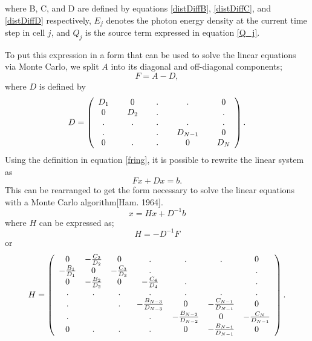	where B, C, and D are defined by equations \ref{distDiffB}, \ref{distDiffC}, and \ref{distDiffD} respectively, $E_j$ denotes the photon energy density at the current time step in cell $j$, and $Q_j$ is the source term expressed in equation \ref{Q_j}.
	
	To put this expression in a form that can be used to solve the linear equations via Monte Carlo, we split $A$ into its diagonal and off-diagonal components;
	\begin{equation}
	\label{fring}
	F=A-D,
	\end{equation}
	where $D$ is defined by
	\[
	D=
	\left(
	\begin{array}{ c c c c c c c c c }
	D_1 & \, & 0 & \, & . & \, & . & \, & 0 \\
	0 & \, & D_2 & \, & . & \, & \, & \, & . \\
	. & \, & . & \, & . & \, & . & \, & . \\
	. & \, & \, & \, & .  & \, & D_{N-1} & \, & 0  \\
	0 & \, & . & \, & . & \, & 0 & \, & D_{N} \\
	\end{array}
	\right).
	\]
	Using the definition in equation \ref{fring}, it is possible to rewrite the linear system as
	\begin{equation}
	Fx+Dx=b.
	\end{equation}
	This can be rearranged to get the form necessary to solve the linear equations with a Monte Carlo algorithm[Ham. 1964].
	\begin{equation}
	\label{linearMC}
	x=Hx+D^{-1}b
	\end{equation}
	where $H$ can be expressed as;
	\begin{equation}
	H=-D^{-1}F
	\end{equation}
	or
	\[
	H=
	\left(
	\begin{array}{ c c c c c c c}
	0  & -{C_2\over{D_2}}  & 0   & .  & .  & .  & 0 \\
	-{B_1\over{D_1}}  & 0  & -{C_3\over{D_3}}  & .  & \, & \,  & . \\
	0 &  -{B_2\over{D_2}} & 0  & -{C_4\over{D_4}} & . & \, & . \\
	. & . & . & . & . & . & . \\
	. & \, & . & -{B_{N-3}\over{D_{N-3}}} & 0 & -{C_{N-1}\over{D_{N-1}}} & 0 \\
	. & \, & \, & . & -{B_{N-2}\over{D_{N-2}}} & 0 & -{C_{N}\over{D_{N-1}}} \\
	0 & .  & . & . & 0 & -{B_{N-1}\over{D_{N-1}}} & 0 \\
	\end{array}
	\right).
	\]

